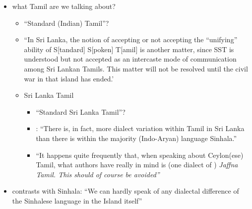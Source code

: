 \documentclass[a4paper,utf8]{article}
\begin{document}
 
\begin{itemize}
 \item what Tamil are we talking about?
  \begin{itemize}
   \item ``Standard (Indian) Tamil''? \citep{Schiffman1999}
   \item ``In Sri Lanka, the notion of accepting or not accepting  the ``unifying'' ability of S[tandard] S[poken] T[amil] is another matter, since SST is understood but not accepted as an intercaste mode of communication among Sri Lankan Tamils. This matter will not be resolved until the civil war in that island has ended.'
   \item Sri Lanka Tamil
     \begin{itemize}
   \item ``Standard Sri Lanka Tamil''?
   \item \citet[170f]{Gairdonotuse}: ``There is, in fact, more dialect variation within  Tamil in Sri Lanka than there is within the majority (Indo-Aryan) language Sinhala.''
   \item ``It happens  quite frequently that, when speaking about  Ceylon(ese) Tamil, what authors have really in mind is (one dialect of ) \em Jaffna \em Tamil. This should of course be avoided''\citep[137]{Zvelebil1966} 
     \end{itemize}
  \end{itemize}
\item contrasts with Sinhala: ``We can hardly speak of any dialectal difference of the Sinhalese language in the Island itself''\citep[168]{Geiger1938}
\end{itemize}
\end{document}
